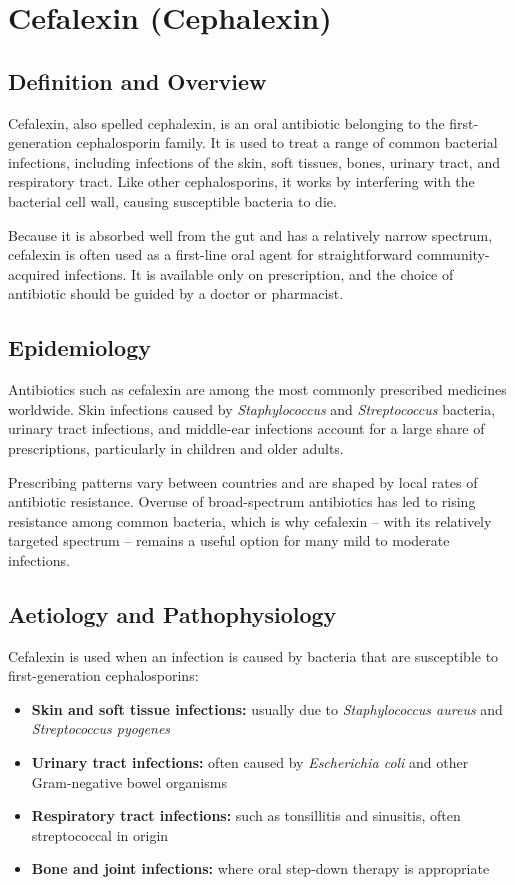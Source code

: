 \chapter{Cefalexin (Cephalexin)}

\section*{Definition and Overview}
Cefalexin, also spelled cephalexin, is an oral antibiotic belonging to the first-generation cephalosporin family. It is used to treat a range of common bacterial infections, including infections of the skin, soft tissues, bones, urinary tract, and respiratory tract. Like other cephalosporins, it works by interfering with the bacterial cell wall, causing susceptible bacteria to die.

Because it is absorbed well from the gut and has a relatively narrow spectrum, cefalexin is often used as a first-line oral agent for straightforward community-acquired infections. It is available only on prescription, and the choice of antibiotic should be guided by a doctor or pharmacist.

\section*{Epidemiology}
Antibiotics such as cefalexin are among the most commonly prescribed medicines worldwide. Skin infections caused by \textit{Staphylococcus} and \textit{Streptococcus} bacteria, urinary tract infections, and middle-ear infections account for a large share of prescriptions, particularly in children and older adults.

Prescribing patterns vary between countries and are shaped by local rates of antibiotic resistance. Overuse of broad-spectrum antibiotics has led to rising resistance among common bacteria, which is why cefalexin -- with its relatively targeted spectrum -- remains a useful option for many mild to moderate infections.

\section*{Aetiology and Pathophysiology}
Cefalexin is used when an infection is caused by bacteria that are susceptible to first-generation cephalosporins:

\begin{itemize}
    \item \textbf{Skin and soft tissue infections:} usually due to \textit{Staphylococcus aureus} and \textit{Streptococcus pyogenes}
    \item \textbf{Urinary tract infections:} often caused by \textit{Escherichia coli} and other Gram-negative bowel organisms
    \item \textbf{Respiratory tract infections:} such as tonsillitis and sinusitis, often streptococcal in origin
    \item \textbf{Bone and joint infections:} where oral step-down therapy is appropriate
\end{itemize}

